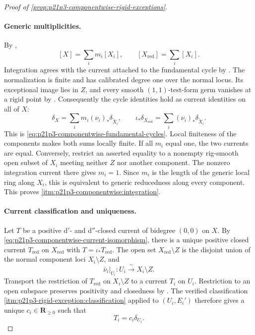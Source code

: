 \begin{proof}[Proof of
\cref{prop:p21p3-componentwise-rigid-exceptions}]
\paragraph{Generic multiplicities.}
By \cite[Definition~13.2.5 and \S13.5.2]{CLD25},
\[
                   [X]=\sum_i m_i[X_i],
 \qquad
                   [X_{\mathrm{red}}]=\sum_i[X_i].
\]
Integration agrees with the current attached to the fundamental cycle by
\cite[Proposition~16.6.3]{CLD25}.  The normalization is finite and has
calibrated degree one over the normal locus.  Its exceptional image lies in
$Z$, and every smooth $(1,1)$-test-form germ vanishes at a rigid point by
\cite[Proposition~3.3.6 and Proposition~15.2.1(a)]{CLD25}.  Consequently
the cycle identities hold as current identities on all of $X$:
\[
       \delta_X=\sum_i m_i(\nu_i)_*\delta_{\widetilde X_i},
 \qquad
       \iota_*\delta_{X_{\mathrm{red}}}
          =\sum_i(\nu_i)_*\delta_{\widetilde X_i}.
\]
This is \eqref{eq:p21p3-componentwise-fundamental-cycles}.  Local finiteness
of the components makes both sums locally finite.  If all $m_i$ equal one,
the two currents are equal.  Conversely, restrict an asserted equality to a
nonempty rig-smooth open subset of $X_i$ meeting neither $Z$ nor another
component.  The nonzero integration current there gives $m_i=1$.  Since
$m_i$ is the length of the generic local ring along $X_i$, this is
equivalent to generic reducedness along every component.  This proves
\cref{itm:p21p3-componentwise:integration}.

\paragraph{Current classification and uniqueness.}
Let $T$ be a positive $\mathrm d'$- and $\mathrm d''$-closed current of
bidegree $(0,0)$ on $X$.  By
\eqref{eq:p21p3-componentwise-current-isomorphism}, there is a unique
positive closed current $T_{\mathrm{red}}$ on $X_{\mathrm{red}}$ with
$T=\iota_*T_{\mathrm{red}}$.  The open set
$X_{\mathrm{red}}\setminus Z$ is the disjoint union of the normal component
loci $X_i\setminus Z$, and
\[
 \bar\nu_i|_{U_i}:U_i\xrightarrow{\ \sim\ }X_i\setminus Z.
\]
Transport the restriction of $T_{\mathrm{red}}$ on $X_i\setminus Z$ to a
current $T_i$ on $U_i$.  Restriction to an open subspace preserves
positivity and closedness by \cite[\S7.1.6 and \S\S7.7.1--7.7.3]{CLD25}.
The verified classification
\cref{itm:p21p3-rigid-exception:classification} applied to $(U_i,E_i')$
therefore gives a unique $c_i\in\mathbf R_{\geq0}$ such that
\begin{equation}
 \label{eq:p21p3-componentwise-classification-off-Z}
                            T_i=c_i\delta_{U_i}.
\end{equation}


\end{proof}
